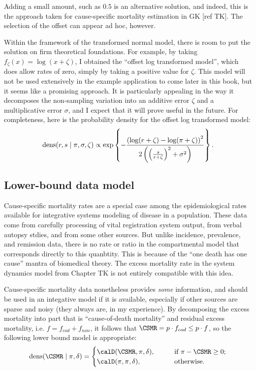 Adding a small amount, such as $0.5$ is an alternative solution, and
indeed, this is the approach taken for cause-specific mortality estimation
in GK [ref TK].  The selection of the offset can appear ad hoc,
however.

Within the framework of the transformed normal model, there is
room to put the solution on firm theoretical foundations.  For
example, by taking $f_\zeta(x) = \log(x + \zeta)$, I obtained the
``offset log transformed model'', which does allow rates of zero,
simply by taking a positive value for $\zeta$.  This model will not be
used extensively in the example application to come later in this
book, but it seems like a promising approach.  It is particularly
appealing in the way it decomposes the non-sampling variation into an
additive error $\zeta$ and a multiplicative error $\sigma$, and I
expect that it will prove useful in the future.  For completeness,
here is the probability density for the offset log transformed model:
\[
\operatorname{dens}(r,s\;|\; \pi, \sigma, \zeta) \propto
\exp\left\{-\frac{\left(\log(r+\zeta)-\log(\pi+\zeta)\right)^2}{2\left(\left(\frac{s}{r+\zeta}\right)^2+\sigma^2\right)}\right\}.
\]

\subsection{Lower-bound data model}
Cause-specific mortality rates are a special case among the
epidemiological rates available for integrative systems modeling of
disease in a population.  These data come from carefully processing of
vital registration system output, from verbal autopsy stdies, and from
some other sources. But unlike incidence, prevalence, and remission
data, there is no rate or ratio in the compartmental model that
corresponds directly to this quanbtity.  This is because of the ``one
death has one cause'' mantra of biomedical theory.  The excess
mortality rate in the system dynamics model from Chapter TK is not
entirely compatible with this idea.

Cause-specific mortality data nonetheless provides \emph{some}
information, and should be used in an integative model if it is
available, especially if other sources are sparse and noisy (they
always are, in my experience).  By decomposing the excess mortality
into part that is ``cause-of-death mortality'' and residual excess
mortality, i.e. $f = f_{cod} + f_{non}$, it follows that $\CSMR =p
\cdot f_{cod} \leq p\cdot f$, so the following lower bound model is
appropriate:
\[
\dens(\CSMR \given \pi,\delta)
=
\begin{cases}
\calD(\CSMR, \pi, \delta), &\qquad\text{if } \pi-\CSMR \geq 0;\\
\calD(\pi, \pi, \delta), &\qquad\text{otherwise.}
\end{cases}
\]

